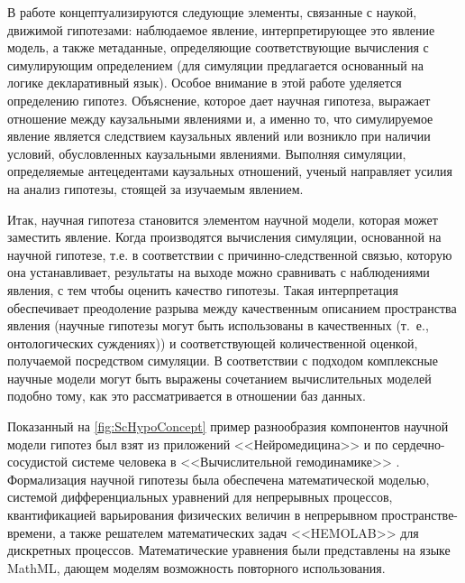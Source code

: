 В работе \cite{porto2013} концептуализируются следующие элементы, связанные с наукой, движимой гипотезами: 
наблюдаемое явление, интерпретирующее это явление модель, а также метаданные, определяющие соответствующие вычисления 
с симулирующим определением (для симуляции предлагается основанный на логике декларативный язык). Особое внимание в 
этой работе уделяется определению гипотез. Объяснение, которое дает научная гипотеза, выражает отношение между 
каузальными явлениями и, а именно то, что симулируемое явление является следствием каузальных явлений или возникло 
при наличии условий, обусловленных каузальными явлениями. Выполняя симуляции, определяемые антецедентами каузальных 
отношений, ученый направляет усилия на анализ гипотезы, стоящей за изучаемым явлением.

Итак, научная гипотеза становится элементом научной модели, которая может заместить явление. Когда производятся 
вычисления симуляции, основанной на научной гипотезе, т.е. в соответствии с причинно-следственной связью, которую 
она устанавливает, результаты на выходе можно сравнивать с наблюдениями явления, с тем чтобы оценить качество гипотезы. 
Такая интерпретация обеспечивает преодоление разрыва между качественным описанием пространства явления (научные 
гипотезы могут быть использованы в качественных (т.~е., онтологических суждениях)) и соответствующей количественной 
оценкой, получаемой посредством симуляции. В соответствии с подходом \cite{porto2013} комплексные научные модели могут 
быть выражены сочетанием вычислительных моделей подобно тому, как это рассматривается в отношении баз данных.

Показанный на \cref{fig:ScHypoConcept} пример разнообразия компонентов научной модели гипотез был взят из приложений 
<<Нейромедицина>> \cite{porto2013, porto2012scientific} и по сердечно-сосудистой системе человека в 
<<Вычислительной гемодинамике>> \cite{Goncalves2013, Porto2011}. Формализация научной гипотезы была обеспечена 
математической моделью, системой дифференциальных уравнений для непрерывных процессов, квантификацией варьирования 
физических величин в непрерывном пространстве-времени, а также решателем математических задач <<HEMOLAB>> для 
дискретных процессов. Математические уравнения были представлены на языке MathML, дающем моделям возможность 
повторного использования. 

